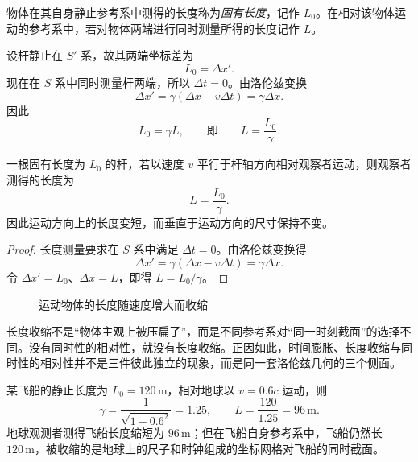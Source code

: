 \begin{definition}
物体在其自身静止参考系中测得的长度称为\emph{固有长度}，记作 $L_0$。在相对该物体运动的参考系中，若对物体两端进行同时测量所得的长度记作 $L$。
\end{definition}

设杆静止在 $S'$ 系，故其两端坐标差为
\[
L_0=\Delta x'.
\]
现在在 $S$ 系中同时测量杆两端，所以 $\Delta t=0$。由洛伦兹变换
\[
\Delta x'=\gamma(\Delta x-v\Delta t)=\gamma\Delta x.
\]
因此
\[
L_0=\gamma L,
\qquad \text{即} \qquad L=\frac{L_0}{\gamma}.
\]

\begin{theorem}[长度收缩]
一根固有长度为 $L_0$ 的杆，若以速度 $v$ 平行于杆轴方向相对观察者运动，则观察者测得的长度为
\[
L=\frac{L_0}{\gamma}.
\]
因此运动方向上的长度变短，而垂直于运动方向的尺寸保持不变。
\end{theorem}

\begin{proof}
长度测量要求在 $S$ 系中满足 $\Delta t=0$。由洛伦兹变换得
\[
\Delta x'=\gamma(\Delta x-v\Delta t)=\gamma\Delta x.
\]
令 $\Delta x'=L_0$、$\Delta x=L$，即得 $L=L_0/\gamma$。
\end{proof}

\begin{figure}[htbp]
\centering
{}
\caption{运动物体的长度随速度增大而收缩}
\end{figure}

\begin{remark}
长度收缩不是“物体主观上被压扁了”，而是不同参考系对“同一时刻截面”的选择不同。没有同时性的相对性，就没有长度收缩。正因如此，时间膨胀、长度收缩与同时性的相对性并不是三件彼此独立的现象，而是同一套洛伦兹几何的三个侧面。
\end{remark}

\begin{example}[运动飞船的长度]
某飞船的静止长度为 $L_0=120\,\mathrm{m}$，相对地球以 $v=0.6c$ 运动，则
\[
\gamma=\frac{1}{\sqrt{1-0.6^2}}=1.25,
\qquad
L=\frac{120}{1.25}=96\,\mathrm{m}.
\]
地球观测者测得飞船长度缩短为 $96\,\mathrm{m}$；但在飞船自身参考系中，飞船仍然长 $120\,\mathrm{m}$，被收缩的是地球上的尺子和时钟组成的坐标网格对飞船的同时截面。
\end{example}

